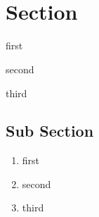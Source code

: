 \documentclass{jdrp}
\begin{document}
    \begin{titlepage}

    \begin{center}
        \hspace*{\vfill}
        \noindent\Huge{}\\ 
        \noindent\fontsize{50}{70}\jedifont{\$}
        \noindent\fontsize{50}{70}\jedifont{\#}\\
        \noindent\fontsize{40}{60}
        \hspace*{\vfill}
    \end{center}

    \noindent{}
    \end{titlepage}

    \section{Section}

    \lipsum[1]

    \begin{rebelist}
        \item first
        \item second
        \item third
    \end{rebelist}

    \newpage %
    \subsection{Sub Section}
    \lipsum[2]

    \begin{quotebox}
        \lipsum[3]
    \end{quotebox}
    
    \begin{enumerate}
        \item first
        \item second
        \item third
    \end{enumerate}
\end{document}
